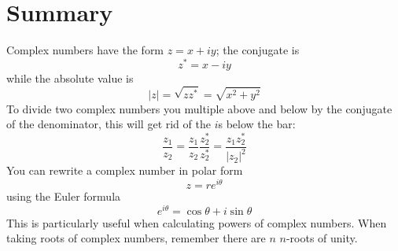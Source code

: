 \documentclass[12pt]{article}
\begin{document}
\section*{Summary}
Complex numbers have the form $z=x+iy$; the conjugate is
\begin{equation}
  z^*=x-iy
\end{equation}
while the absolute value is
\begin{equation}
  |z|=\sqrt{zz^*}=\sqrt{x^2+y^2}
\end{equation}
To divide two complex numbers you multiple above and below by the conjugate of the denominator, this will get rid of the $i$s below the bar:
\begin{equation}
  \frac{z_1}{z_2}=\frac{z_1}{z_2}\frac{z_2^*}{z_2^*}=\frac{z_1z_2^*}{|z_2|^2}
\end{equation}
You can rewrite a complex number in polar form
\begin{equation}
  z=re^{i\theta}
\end{equation}
using the Euler formula
\begin{equation}
  e^{i\theta}=\cos{\theta}+i\sin{\theta}
\end{equation}
This is particularly useful when calculating powers of complex
numbers. When taking roots of complex numbers, remember there are $n$
$n$-roots of unity.
\end{document}
